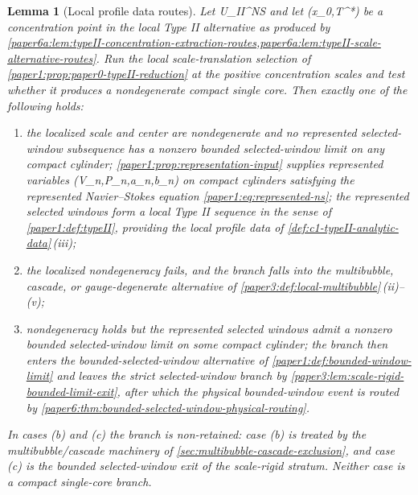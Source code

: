 \documentclass[11pt]{amsart}
\def\({}%
\def\){}%
\def\mathrm#1{#1}%
\theoremstyle{plain}
\newtheorem{lemma}[lemma]{Lemma}
\theoremstyle{definition}
\theoremstyle{remark}
\begin{document}
\begin{lemma}[Local profile data routes]
\label{paper6a:lem:typeII-profile-data-routes}
Let \(\omega\in\mathcal U_{\mathrm{II}}^{NS}\) and let \((x_0,T^*)\) be a
concentration point in the local Type II alternative as produced by
\cref{paper6a:lem:typeII-concentration-extraction-routes,paper6a:lem:typeII-scale-alternative-routes}.
Run the local scale-translation selection of
\cref{paper1:prop:paper0-typeII-reduction} at the positive concentration
scales and test whether it produces a nondegenerate compact single core.  Then
exactly one of the following holds:
\begin{enumerate}[label=\textup{(\alph*)}]
\item the localized scale and center are nondegenerate and no represented
selected-window subsequence has a nonzero bounded selected-window limit on
any compact cylinder; \cref{paper1:prop:representation-input} supplies
represented variables \((V_n,P_n,a_n,b_n)\) on compact cylinders satisfying
the represented Navier--Stokes equation
\eqref{paper1:eq:represented-ns}; the represented selected windows form a
local Type II sequence in the sense of \cref{paper1:def:typeII}, providing
the local profile data of
\cref{def:c1-typeII-analytic-data}\,\textup{(iii)};
\item the localized nondegeneracy fails, and the branch falls into the
multibubble, cascade, or gauge-degenerate alternative of
\cref{paper3:def:local-multibubble}\,\textup{(ii)}--\textup{(v)};
\item nondegeneracy holds but the represented selected windows admit a
nonzero bounded selected-window limit on some compact cylinder; the branch
then enters the bounded-selected-window alternative of
\cref{paper1:def:bounded-window-limit} and leaves the strict selected-window
branch by \cref{paper3:lem:scale-rigid-bounded-limit-exit}, after which the
physical bounded-window event is routed by
\cref{paper6:thm:bounded-selected-window-physical-routing}.
\end{enumerate}
In cases \textup{(b)} and \textup{(c)} the branch is non-retained: case
\textup{(b)} is treated by the multibubble/cascade machinery of
\cref{sec:multibubble-cascade-exclusion}, and case \textup{(c)} is the
bounded selected-window exit of the scale-rigid stratum.  Neither case is
a compact single-core branch.
\end{lemma}
\end{document}
